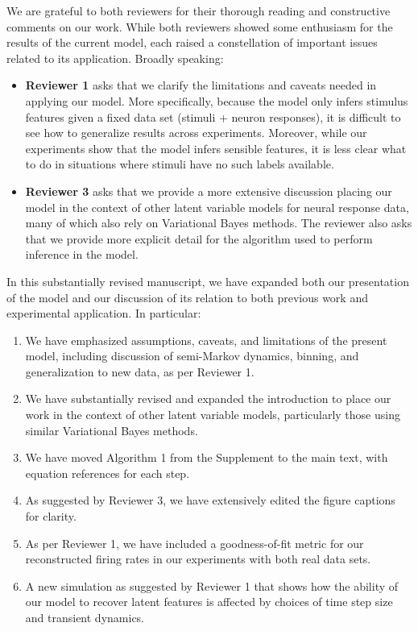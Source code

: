 \documentclass[12pt,a4paper]{article}
\newcommand{\edit}[1]{\textcolor{edit}{#1}}
\begin{document}
\edit{We are grateful to both reviewers for their thorough reading and constructive comments on our work. While both reviewers showed some enthusiasm for the results of the current model, each raised a constellation of important issues related to its application. Broadly speaking:
\begin{itemize}
    \item {\bf Reviewer 1} asks that we clarify the limitations and caveats needed in applying our model. More specifically, because the model only infers stimulus features given a fixed data set (stimuli + neuron responses), it is difficult to see how to generalize results across experiments. Moreover, while our experiments show that the model infers sensible features, it is less clear what to do in situations where stimuli have no such labels available.
    \item {\bf Reviewer 3} asks that we provide a more extensive discussion placing our model in the context of other latent variable models for neural response data, many of which also rely on Variational Bayes methods. The reviewer also asks that we provide more explicit detail for the algorithm used to perform inference in the model.
\end{itemize}
}

\edit{In this substantially revised manuscript, we have expanded both our presentation of the model and our discussion of its relation to both previous work and experimental application. In particular:
\begin{enumerate}
    \item We have emphasized assumptions, caveats, and limitations of the present model, including discussion of semi-Markov dynamics, binning, and generalization to new data, as per Reviewer 1.
    \item We have substantially revised and expanded the introduction to place our work in the context of other latent variable models, particularly those using similar Variational Bayes methods.
    \item We have moved Algorithm 1 from the Supplement to the main text, with equation references for each step.
    \item As suggested by Reviewer 3, we have extensively edited the figure captions for clarity.
    \item As per Reviewer 1, we have included a goodness-of-fit metric for our reconstructed firing rates in our experiments with both real data sets.
    \item A new simulation as suggested by Reviewer 1 that shows how the ability of our model to recover latent features is affected by choices of time step size and transient dynamics.
\end{enumerate}
}
\end{document}
